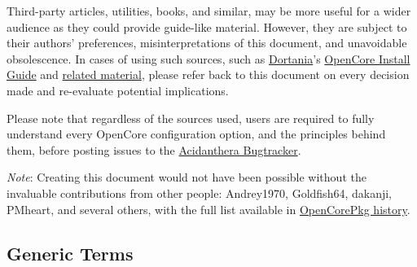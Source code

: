 \documentclass[]{article}
\begin{document}
Third-party articles, utilities, books, and similar, may be more useful for a wider audience as
they could provide guide-like material. However, they are subject to their authors' preferences,
misinterpretations of this document, and unavoidable obsolescence.
In cases of using such sources, such as \href{https://dortania.github.io}{Dortania}'s
\href{https://dortania.github.io/OpenCore-Install-Guide}{OpenCore Install Guide}
and \href{https://dortania.github.io/getting-started}{related material},
please refer back to this document on every decision made and re-evaluate potential implications.

Please note that regardless of the sources used, users are required to fully understand every
OpenCore configuration option, and the principles behind them, before posting issues to the
\href{https://github.com/acidanthera/bugtracker}{Acidanthera Bugtracker}.

\emph{Note}: Creating this document would not have been possible without the invaluable
contributions from other people: Andrey1970, Goldfish64, dakanji, PMheart, and several others,
with the full list available in
\href{https://github.com/acidanthera/OpenCorePkg/commits/master/Docs}{OpenCorePkg history}.

\subsection{Generic Terms}\label{generic-terms}
\end{document}
